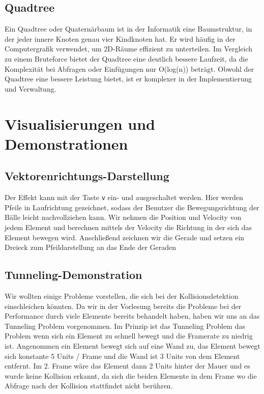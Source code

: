 \documentclass[12pt,a4paper]{article}
\begin{document}
\subsection{Quadtree}
Ein Quadtree oder Quaternärbaum ist in der Informatik eine Baumstruktur, in der jeder innere Knoten genau vier Kindknoten hat. \cite{Quadtree} Er wird häufig in der Computergrafik verwendet, um 2D-Räume effizient zu unterteilen. Im Vergleich zu einem Bruteforce bietet der Quadtree eine deutlich bessere Laufzeit, da die Komplexität bei Abfragen oder Einfügungen nur O(log(n)) beträgt. Obwohl der Quadtree eine bessere Leistung bietet, ist er komplexer in der Implementierung und Verwaltung.

	
	\section{Visualisierungen und Demonstrationen}
	
	
	\subsection{Vektorenrichtungs-Darstellung}
	
	Der Effekt kann mit der Taste \texttt{v} ein- und ausgeschaltet werden.  
	Hier werden Pfeile in Laufrichtung gezeichnet, sodass der Benutzer die Bewegungsrichtung der Bälle leicht nachvollziehen kann.  
	Wir nehmen die Position und Velocity von jedem Element und berechnen mittels der Velocity die Richtung in der sich das Element bewegen wird. Anschließend zeichnen wir die Gerade und setzen ein Dreieck zum Pfeildarstellung an das Ende der Geraden
		
	
	\subsection{Tunneling-Demonstration}
	
	Wir wollten einige Probleme vorstellen, die sich bei der Kollisionsdetektion einschleichen könnten.
	Da wir in der Vorlesung bereits die Probleme bei der Performance durch viele Elemente bereits behandelt haben, haben wir uns an das Tunneling Problem \cite{tunneling_source} vorgenommen.
	\newline
	Im Prinzip ist das Tunneling Problem das Problem wenn sich ein Element zu schnell bewegt und die Framerate zu niedrig ist. Angenommen ein Element bewegt sich auf eine Wand zu, das Element bewegt sich konstante 5 Units / Frame und die Wand ist 3 Units von dem Element entfernt. Im 2. Frame wäre das Element dann 2 Units hinter der Mauer und es wurde keine Kollision erkannt, da sich die beiden Elemente in dem Frame wo die Abfrage nach der Kollision stattfindet nicht berühren.
	
\end{document}
